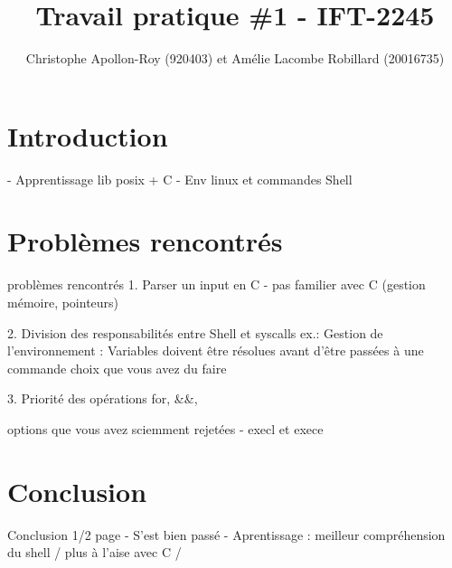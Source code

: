 \documentclass{article}
\title{Travail pratique \#1 - IFT-2245}
\author{Christophe Apollon-Roy (920403) et Amélie Lacombe Robillard (20016735)}
\begin{document}
\maketitle
\section*{ Introduction }
- Apprentissage lib posix + C
- Env linux et commandes Shell

\section*{ Problèmes rencontrés }problèmes rencontrés
1. Parser un input en C - pas familier avec C (gestion mémoire, pointeurs)

2. Division des responsabilités entre Shell et syscalls 
ex.: Gestion de l'environnement : Variables doivent être résolues avant d'être passées à une commande
choix que vous avez du faire

3. Priorité des opérations for, &&, 

options que vous avez sciemment rejetées
- execl et exece 

\section*{ Conclusion } Conclusion 1/2 page
- S'est bien passé
- Aprentissage : meilleur compréhension du shell / plus à l'aise avec C / 
\end{document}
